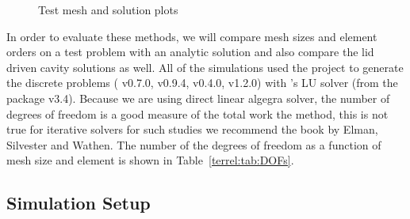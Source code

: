 \begin{figure}[ht]
{\label{terrel:fig:vel_test}
}
\qquad
{}
\label{terrel:fig:meshsolution}
\caption{Test mesh and solution plots}
\end{figure}

In order to evaluate these methods, we will compare mesh sizes and element
orders on a test problem with an analytic solution and also compare the lid
driven cavity solutions as well.  All of the simulations used the \fenics{}
project to generate the discrete problems (\ffc{} v0.7.0,\dolfin{} v0.9.4,
\ufl{} v0.4.0, \ufc{} v1.2.0) with 's LU solver (from the
 package v3.4).  Because we are using direct linear
algegra solver, the number of degrees of freedom is a good measure of the total
work the method, this is not true for iterative solvers for such studies we
recommend the book by Elman, Silvester and Wathen\cite{ElmanEtAl2005}.  The
number of the degrees of freedom as a function of mesh size and element is
shown in Table~\ref{terrel:tab:DOFs}.

\subsection{Simulation Setup}

